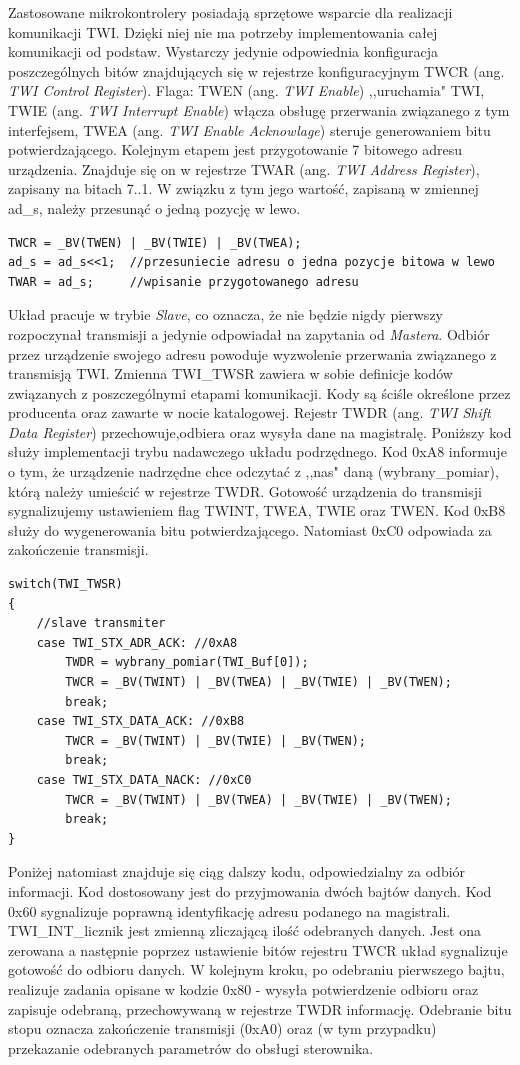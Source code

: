 Zastosowane mikrokontrolery posiadają sprzętowe wsparcie dla realizacji komunikacji TWI. Dzięki niej nie ma potrzeby implementowania całej komunikacji od podstaw. Wystarczy jedynie odpowiednia konfiguracja poszczególnych bitów znajdujących się w rejestrze konfiguracyjnym TWCR (ang. \textit{TWI Control Register})\cite{nota}. Flaga: TWEN (ang. \textit{TWI Enable}) ,,uruchamia" TWI, TWIE (ang. \textit{TWI Interrupt Enable}) włącza obsługę przerwania związanego z tym interfejsem, TWEA (ang. \textit{TWI Enable Acknowlage}) steruje generowaniem bitu potwierdzającego. Kolejnym etapem jest przygotowanie 7 bitowego adresu urządzenia. Znajduje się on w rejestrze TWAR (ang. \textit{TWI Address Register}), zapisany na bitach 7..1. W związku z tym jego wartość, zapisaną w zmiennej ad\_s, należy przesunąć o jedną pozycję w lewo. 
\begin{lstlisting}
TWCR = _BV(TWEN) | _BV(TWIE) | _BV(TWEA);
ad_s = ad_s<<1;  //przesuniecie adresu o jedna pozycje bitowa w lewo
TWAR = ad_s;     //wpisanie przygotowanego adresu
\end{lstlisting}
Układ pracuje w trybie \textit{Slave}, co oznacza, że nie będzie nigdy pierwszy rozpoczynał transmisji a jedynie odpowiadał na zapytania od \textit{Mastera}. Odbiór przez urządzenie swojego adresu powoduje wyzwolenie przerwania związanego z transmisją TWI. Zmienna TWI\_TWSR zawiera w sobie definicje kodów związanych z poszczególnymi etapami komunikacji. Kody są ściśle określone przez producenta oraz zawarte w nocie katalogowej\cite{nota}. Rejestr TWDR (ang. \textit{TWI Shift Data Register}) przechowuje,odbiera oraz wysyła dane na magistralę. Poniższy kod służy implementacji trybu nadawczego układu podrzędnego. Kod 0xA8 informuje o tym, że urządzenie nadrzędne chce odczytać z ,,nas" daną (wybrany\_pomiar), którą należy umieścić w rejestrze TWDR. Gotowość urządzenia do transmisji sygnalizujemy ustawieniem flag TWINT, TWEA, TWIE oraz TWEN. Kod 0xB8 służy do wygenerowania bitu potwierdzającego. Natomiast 0xC0 odpowiada za zakończenie transmisji.
\begin{lstlisting}
switch(TWI_TWSR)
{
	//slave transmiter
	case TWI_STX_ADR_ACK: //0xA8
		TWDR = wybrany_pomiar(TWI_Buf[0]);
		TWCR = _BV(TWINT) | _BV(TWEA) | _BV(TWIE) | _BV(TWEN);
		break;
	case TWI_STX_DATA_ACK: //0xB8
		TWCR = _BV(TWINT) | _BV(TWIE) | _BV(TWEN);
		break;
	case TWI_STX_DATA_NACK: //0xC0
		TWCR = _BV(TWINT) | _BV(TWEA) | _BV(TWIE) | _BV(TWEN);
		break;
}
\end{lstlisting}
Poniżej natomiast znajduje się ciąg dalszy kodu, odpowiedzialny za odbiór informacji. Kod dostosowany jest do przyjmowania dwóch bajtów danych. Kod 0x60 sygnalizuje poprawną identyfikację adresu podanego na magistrali. TWI\_INT\_licznik jest zmienną zliczającą ilość odebranych danych. Jest ona zerowana a następnie poprzez ustawienie bitów rejestru TWCR układ sygnalizuje gotowość do odbioru danych. W kolejnym kroku, po odebraniu pierwszego bajtu, realizuje zadania opisane w kodzie 0x80 - wysyła potwierdzenie odbioru oraz zapisuje odebraną, przechowywaną w rejestrze TWDR informację. Odebranie bitu stopu oznacza zakończenie transmisji (0xA0) oraz (w tym przypadku) przekazanie odebranych parametrów do obsługi sterownika.
